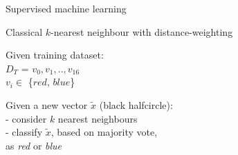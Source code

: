 \documentclass[10pt]{beamer}
\begin{document}
{\begin{frame}[fragile]{Supervised machine learning}

\end{frame}
}

{
\begin{frame}[fragile]{Classical $k$-nearest neighbour with distance-weighting}


\begin{minipage}[t]{.32\textwidth}
Given training dataset:\\
${D}_{T}$ = ${v}_{0}, {v}_{1},..,{v}_{16}$ \\
$v_{i} \in$ \{$red$, $blue$\}
\end{minipage}
\hspace{0.1cm}
\vline
\hspace{0.1cm}
\begin{minipage}[t]{.53\textwidth}
\flushright
Given a new vector $\tilde{x}$ (black halfcircle):\\
- consider $k$ nearest neighbours\\
- classify $\tilde{x}$, based on majority vote,\\as \emph{red} or \emph{blue}
\end{minipage}


\end{frame}}
\end{document}
